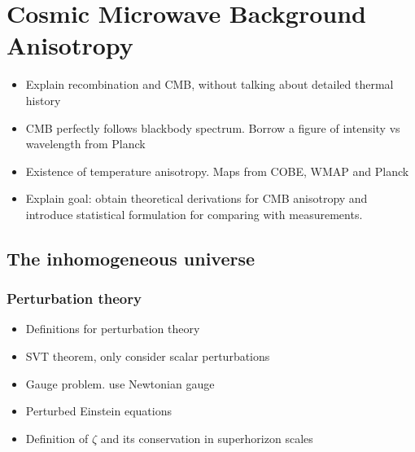 
\chapter{Cosmic Microwave Background Anisotropy}

\ifpdf
    \graphicspath{{Chapter2/Figs/Raster/}{Chapter2/Figs/PDF/}{Chapter2/Figs/}}
\else
    \graphicspath{{Chapter2/Figs/Vector/}{Chapter2/Figs/}}
\fi


\begin{itemize}
	\item Explain recombination and CMB, without talking about detailed thermal history 
	\item CMB perfectly follows blackbody spectrum. Borrow a figure of intensity vs wavelength from Planck
	\item Existence of temperature anisotropy. Maps from COBE, WMAP and Planck
	\item Explain goal: obtain theoretical derivations for CMB anisotropy and introduce statistical formulation for comparing with measurements.	
\end{itemize}

\section{The inhomogeneous universe}

\subsection{Perturbation theory}
\begin{itemize}
	\item Definitions for perturbation theory
	\item SVT theorem, only consider scalar perturbations
	\item Gauge problem. use Newtonian gauge
	\item Perturbed Einstein equations
	\item Definition of $\zeta$ and its conservation in superhorizon scales
\end{itemize}

